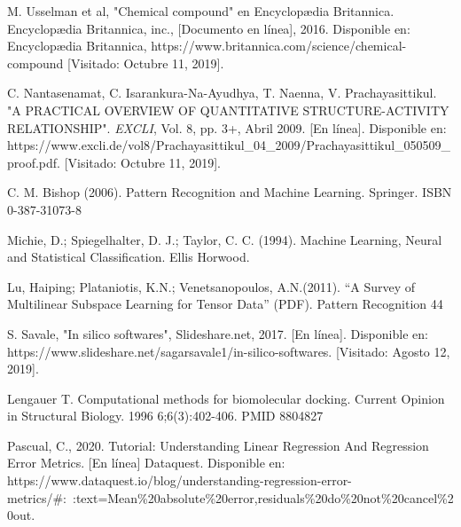 \begin{thebibliography}{99}
M. Usselman et al, "Chemical compound" en Encyclopædia Britannica. Encyclopædia Britannica, inc., [Documento en línea], 2016. Disponible en: Encyclopædia Britannica, https://www.britannica.com/science/chemical-compound [Visitado: Octubre 11, 2019].

C. Nantasenamat, C. Isarankura-Na-Ayudhya, T. Naenna, V. Prachayasittikul. "A PRACTICAL OVERVIEW OF
QUANTITATIVE STRUCTURE-ACTIVITY RELATIONSHIP". \textit{EXCLI}, Vol. 8, pp. 3+, Abril 2009. [En línea]. Disponible en: https://www.excli.de/vol8/Prachayasittikul\_04\_2009/Prachayasittikul\_050509\_proof.pdf. [Visitado: Octubre 11, 2019].

C. M. Bishop (2006). Pattern Recognition and Machine
Learning. Springer. ISBN 0-387-31073-8

Michie, D.; Spiegelhalter, D. J.; Taylor, C. C. (1994). Machine Learning, Neural and Statistical Classification. Ellis Horwood.

Lu, Haiping; Plataniotis, K.N.; Venetsanopoulos, A.N.(2011). “A Survey of Multilinear Subspace Learning for Tensor Data” (PDF). Pattern Recognition 44

S. Savale, "In silico softwares", Slideshare.net, 2017. [En línea]. Disponible en: https://www.slideshare.net/sagarsavale1/in-silico-softwares. [Visitado: Agosto 12, 2019].

Lengauer T. Computational methods for biomolecular docking. Current Opinion in Structural Biology. 1996 6;6(3):402-406. PMID 8804827

Pascual, C., 2020. Tutorial: Understanding Linear Regression And Regression Error Metrics. [En línea] Dataquest. Disponible en: https://www.dataquest.io/blog/understanding-regression-error-metrics/#:~:text=Mean\%20absolute\%20error,residuals\%20do\%20not\%20cancel\%20out.


\end{thebibliography}